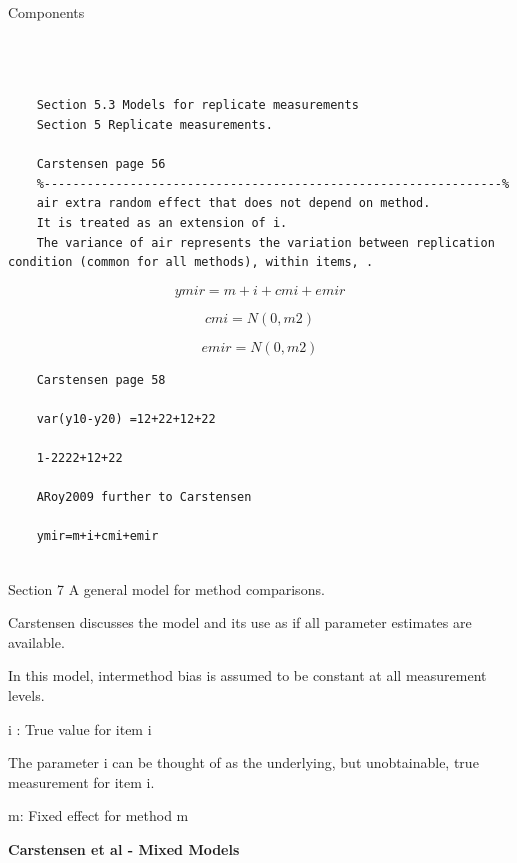 \documentclass[12pt, a4paper]{report}
\theoremstyle{plain}
\theoremstyle{definition}
\theoremstyle{remark}
\begin{document}
	Components
	
	\begin{verbatim}
	
	
	
	Section 5.3 Models for replicate measurements
	Section 5 Replicate measurements.
	
	Carstensen page 56
	%----------------------------------------------------------------%
	air extra random effect that does not depend on method.
	It is treated as an extension of i.
	The variance of air represents the variation between replication condition (common for all methods), within items, .
	\end{verbatim}
	\[ymir=m+i+cmi+emir\]
	
	\[cmi=N(0,m2)\]
	
	\[emir=N(0,m2)\]
	
	\begin{verbatim}
	Carstensen page 58
	
	var(y10-y20) =12+22+12+22
	
	1-2222+12+22
	
	ARoy2009 further to Carstensen
	
	ymir=m+i+cmi+emir
	
	\end{verbatim}
	
	
	Section 7 A general model for method comparisons.
	
	Carstensen discusses the model and its use as if all parameter estimates are available.
	
	In this model, intermethod bias is assumed to be constant at all measurement levels.
	
	i : True value for item i
	
	The parameter i can be thought of as the underlying, but unobtainable, true measurement for item i.
	
	m: Fixed effect for method m
	
	
	\textbf{Carstensen et al - Mixed Models}
	
\end{document}

